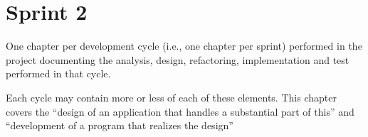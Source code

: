 \chapter{Sprint 2}

One chapter per development cycle (i.e., one chapter per sprint) performed in the project documenting the analysis, design, refactoring, implementation and test performed in that cycle.

Each cycle may contain more or less of each of these elements.
This chapter covers the “design of an application that handles a substantial part of this” and “development of a program that realizes the design”

